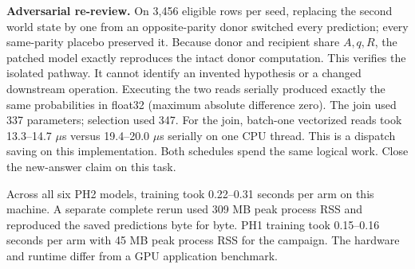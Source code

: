 \par
\textbf{Adversarial re-review.} On 3,456 eligible rows per seed, replacing the second world state by one from an opposite-parity donor switched every prediction; every same-parity placebo preserved it. Because donor and recipient share $A,q,R$, the patched model exactly reproduces the intact donor computation. This verifies the isolated pathway. It cannot identify an invented hypothesis or a changed downstream operation. Executing the two reads serially produced exactly the same probabilities in float32 (maximum absolute difference zero). The join used 337 parameters; selection used 347. For the join, batch-one vectorized reads took 13.3--14.7 $\mu$s versus 19.4--20.0 $\mu$s serially on one CPU thread. This is a dispatch saving on this implementation. Both schedules spend the same logical work. Close the new-answer claim on this task.

\par
Across all six PH2 models, training took 0.22--0.31 seconds per arm on this machine. A separate complete rerun used 309 MB peak process RSS and reproduced the saved predictions byte for byte. PH1 training took 0.15--0.16 seconds per arm with 45 MB peak process RSS for the campaign. The hardware and runtime differ from a GPU application benchmark.
